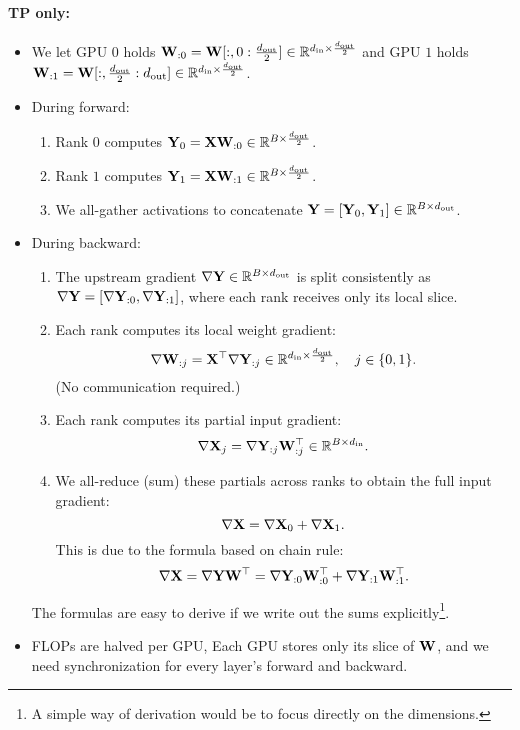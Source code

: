 \documentclass[11pt]{article}  %
\begin{document}
\paragraph{TP only:}
\begin{itemize}
  \item We let GPU $0$ holds $\mathbf{W}_{:0} = \mathbf{W}[:, 0: \frac{d_{\text{out}}}{2}] \in \mathbb{R}^{d_{\text{in}} \times \frac{d_{\text{out}}}{2}}$ and GPU $1$ holds $\mathbf{W}_{:1} = \mathbf{W}[:, \frac{d_{\text{out}}}{2} : d_{\text{out}}] \in \mathbb{R}^{d_{\text{in}} \times \frac{d_{\text{out}}}{2}}$.

  \item During forward:
  \begin{enumerate}
    \item Rank $0$ computes $\mathbf{Y}_0 = \mathbf{X}\mathbf{W}_{:0} \in \mathbb{R}^{B \times \frac{d_{\text{out}}}{2}}$.
    \item Rank $1$ computes $\mathbf{Y}_1 = \mathbf{X}\mathbf{W}_{:1} \in \mathbb{R}^{B \times \frac{d_{\text{out}}}{2}}$.
    \item We all-gather activations to concatenate $\mathbf{Y} = [\mathbf{Y}_0, \mathbf{Y}_1] \in \mathbb{R}^{B \times d_{\text{out}}}$.
  \end{enumerate}

  \item During backward:
  \begin{enumerate}
    \item The upstream gradient $\nabla \mathbf{Y} \in \mathbb{R}^{B \times d_{\text{out}}}$ is split consistently as $\nabla \mathbf{Y} = [\nabla \mathbf{Y}_{:0}, \nabla \mathbf{Y}_{:1}]$, where each rank receives only its local slice.
    \item Each rank computes its local weight gradient:
    \[ \nabla \mathbf{W}_{:j} = \mathbf{X}^\top \nabla \mathbf{Y}_{:j} \in \mathbb{R}^{d_{\text{in}} \times \frac{d_{\text{out}}}{2}}, \quad j \in \{0,1\}. \](No communication required.)

    \item Each rank computes its partial input gradient: 
    \[ \nabla \mathbf{X}_j = \nabla \mathbf{Y}_{:j} \mathbf{W}_{:j}^\top \in \mathbb{R}^{B \times d_{\text{in}}}. \]

    \item We all-reduce (sum) these partials across ranks to obtain the full input gradient:
    \[
        \nabla \mathbf{X} = \nabla \mathbf{X}_0 + \nabla \mathbf{X}_1.
    \]
    This is due to the formula based on chain rule: 
    \[
      \nabla \mathbf{X} = \nabla \mathbf{Y} \mathbf{W}^\top = \nabla \mathbf{Y}_{:0} \mathbf{W}_{:0}^\top + \nabla \mathbf{Y}_{:1} \mathbf{W}_{:1}^\top.
    \]
  \end{enumerate}
  The formulas are easy to derive if we write out the sums explicitly\footnote{A simple way of derivation would be to focus directly on the dimensions.}.

  \item FLOPs are halved per GPU, Each GPU stores only its slice of $\mathbf{W}$, and we need synchronization for every layer's forward and backward.
\end{itemize}
\end{document}
